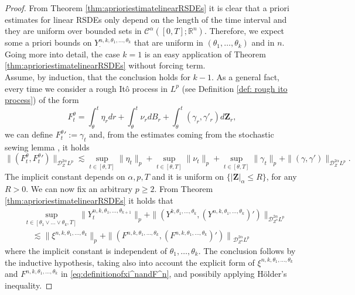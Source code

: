 \documentclass[11pt,a4paper]{article}
\newcommand{\R}{\mathbb{R}}
\theoremstyle{plain}
\begin{document}
\begin{proof} From Theorem \ref{thm:aprioriestimatelinearRSDEs} it is clear that a priori estimates for linear RSDEs only depend on the length of the time interval and they are uniform over bounded sets in $\mathscr{C}^\alpha([0,T];\R^n)$.
Therefore, we expect some a priori bounds on $Y^{n,k,\theta_1,\dots,\theta_k}_\cdot$ that are uniform in $(\theta_1, \ldots, \theta_k)$ and in $n$. \\
Going more into detail, the case $k = 1$ is an easy application of Theorem \ref{thm:aprioriestimatelinearRSDEs} without forcing term. \\
Assume, by induction, that the conclusion holds for $k - 1$. As a general fact, every time we consider a rough It\^o process in $L^p$ (see Definition \ref{def: rough ito process}) of the form  \begin{equation*}
     F_t^{\theta} = \int_{\theta}^t \eta_r d r + \int_{\theta}^t \nu_r d B_r + \int_{\theta}^t (\gamma_r, \gamma'_r) d \mathbf{Z}_r, 
\end{equation*}
we can define ${F_t^{\theta}}':=\gamma_t$ and, from the estimates coming from the stochastic sewing lemma \cite[Theorem 2.9]{FHL21}
, it holds \begin{equation*}
     \| ( F^{\theta}_t {, F^{\theta}_t}' ) \|_{\mathscr{D}_Z^{2\alpha} L^p} \lesssim \sup_{t \in [\theta, T]} \| \eta_t \|_p + \sup_{t \in [\theta, T]} \|\nu_t \|_p + \sup_{t \in [\theta, T]} \| \gamma_t \|_p +\| (\gamma, \gamma')
     \|_{\mathscr{D}_Z^{2 \alpha} L^p}.
\end{equation*}
    The implicit constant depends on $\alpha, p, T$ and it is uniform on $\{ | \mathbf{Z} |_{\alpha} \leqslant R \}$, for any $R > 0$. We can now fix an arbitrary $p\ge 2$. From Theorem \ref{thm:aprioriestimatelinearRSDEs} it holds that \begin{align*}
        &\sup_{t \in [\theta_1 \vee \dots \vee \theta_k, T]} \|Y_t^{n,k, \theta_1,
     \dots, \theta_{k + 1}} \|_p  +\| (Y^{k, \theta_1, \dots,\theta_k}, (Y^{n,k,\theta_1, \ldots, \theta_k})')\|_{\mathscr{D}_{Z^n}^{2 \alpha}L^p} \\
     &\quad \lesssim \| \xi^{n,k, \theta_1, \dots,\theta_k} \|_p + \| (F^{n,k, \theta_1, \dots, \theta_k}, (F^{n,k,\theta_1, \ldots, \theta_k})') \| {_{\mathscr{D}_{Z^n}^{2 \alpha} L^p}}
    \end{align*}
  where the implicit constant is independent of $\theta_1,\dots,\theta_k$. The conclusion follows by the inductive hypothesis, taking also into account the explicit form of $\xi^{n,k, \theta_1, \dots,\theta_k}$ and $F^{n,k, \theta_1, \dots, \theta_k}$ in \eqref{eq:definitionofxi^nandF^n}, and possibily applying H\"older's inequality.
  \end{proof}
\end{document}
